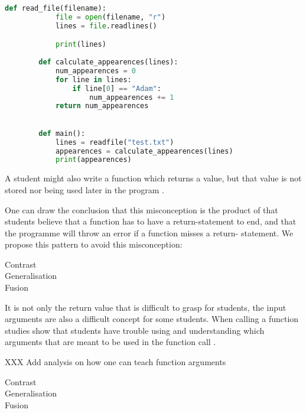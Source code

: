 \begin{enumerate}
     \begin{lstlisting}[language=Python]
        def read_file(filename):
            file = open(filename, "r")
            lines = file.readlines()

            print(lines)
            
        def calculate_appearences(lines):
            num_appearences = 0
            for line in lines:
                if line[0] == "Adam":
                    num_appearences += 1
            return num_appearences
            

        def main():
            lines = readfile("test.txt")
            appearences = calculate_appearences(lines)
            print(appearences)
    \end{lstlisting}
    
\end{enumerate}

A student might also write a function which returns a value, but that value 
is not stored nor being used later in the program 
\parencite{AltadmriBrown2015}.


One can draw the conclusion that this misconception is the product of that 
students believe that a function has to have a return-statement to end, and 
that the programme will throw an error if a function misses a return-
statement. We propose this pattern to avoid this misconception:

\begin{description}
    \item[Contrast]
    \item[Generalisation]
    \item[Fusion]
\end{description}

It is not only the return value that is difficult to grasp for students, the 
input arguments are also a difficult concept for some students. When 
calling a 
function studies show that students have trouble using and understanding 
which 
arguments that are meant to be used in the function call 
\parencite{AltadmriBrown2015}. 

XXX Add analysis on how one can teach function arguments

\begin{description}
    \item[Contrast]
    \item[Generalisation]
    \item[Fusion]
\end{description}


